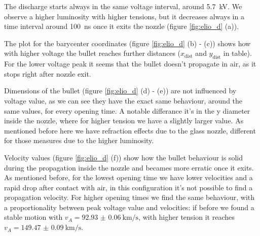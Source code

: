 The discharge starts always in the same voltage interval, around \SI{5.7}{\kilo\volt}. We observe a higher luminosity with higher tensions, but it decreases always in a time interval around \SI{100}{\nano\second} once it exits the nozzle (figure \ref{fig:elio_d} (a)).

The plot for the barycenter coordinates (figure \ref{fig:elio_d} (b) - (c)) shows how with higher voltage the bullet reaches further distances ($x_{\text{dist}}$ and $y_{\text{dist}}$ in table). For the lower voltage peak it seems that the bullet doesn't propagate in air, as it stops right after nozzle exit.

Dimensions of the bullet (figure \ref{fig:elio_d} (d) - (e)) are not influenced by voltage value, as we can see they have the exact same behaviour, around the same values, for every opening time. A notable differance it's in the y diameter inside the nozzle, where for higher tension we have a slightly larger value. As mentioned before here we have refraction effects due to the glass nozzle, different for those measures due to the higher luminosity.

Velocity values (figure \ref{fig:elio_d} (f)) show how the bullet behaviour is solid during the propagation inside the nozzle and becames more erratic once it exits. As mentioned before, for the lowest opening time we have lower velocities and a rapid drop after contact with air, in this configuration it's not possible to find a propagation velocity. For higher opening times we find the same behaviour, with a proportionality between peak voltage value and velocities: if before we found a stable motion with $v_{A} = \SI{92.93(6)}{\kilo\meter/\second}$, with higher tension it reaches $v_{A} = \SI{149.47(9)}{\kilo\meter/\second}$.

